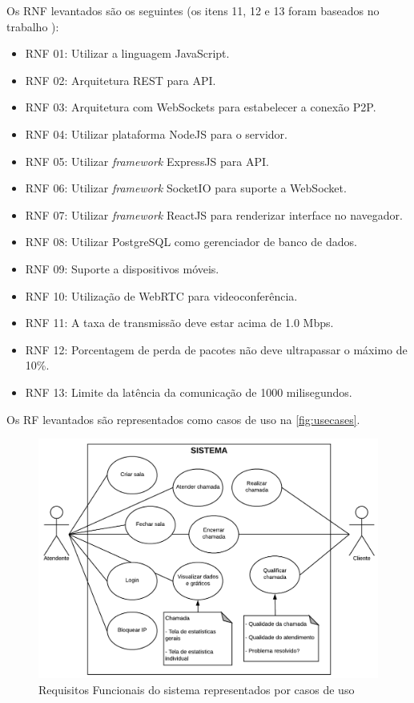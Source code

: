 Os RNF levantados são os seguintes (os itens 11, 12 e 13 foram baseados no trabalho \cite[Sec.~4.3.1]{webrtcquality}):
\begin{itemize}
	\item RNF 01: Utilizar a linguagem JavaScript.
    \item RNF 02: Arquitetura REST para API.
    \item RNF 03: Arquitetura com WebSockets para estabelecer a conexão P2P.
    \item RNF 04: Utilizar plataforma NodeJS para o servidor.
    \item RNF 05: Utilizar \textit{framework} ExpressJS para API.
    \item RNF 06: Utilizar \textit{framework} SocketIO para suporte a WebSocket.
    \item RNF 07: Utilizar \textit{framework} ReactJS para renderizar interface no navegador.
    \item RNF 08: Utilizar PostgreSQL como gerenciador de banco de dados.
    \item RNF 09: Suporte a dispositivos móveis.
    \item RNF 10: Utilização de WebRTC para videoconferência.
    \item RNF 11: A taxa de transmissão deve estar acima de 1.0 Mbps.
    \item RNF 12: Porcentagem de perda de pacotes não deve ultrapassar o máximo de 10\%.
    \item RNF 13: Limite da latência da comunicação de 1000 milisegundos.
\end{itemize}

Os RF levantados são representados como casos de uso na \autoref{fig:usecases}.

\begin{figure}[ht!]
	\centering
    \includegraphics[scale=0.9]{figures/usecases.png} 
	\caption{Requisitos Funcionais do sistema representados por casos de uso}
	\label{fig:usecases}
\end{figure}

